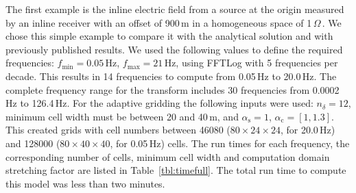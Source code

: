 \documentclass[onecolumn,extra,referee,camera]{gji}
\newcommand{\mr}[1]{\mathrm{#1}}
\newcommand{\ohmm}{\ensuremath{\Omega\,}\text{m}\xspace}
\begin{document}
The first example is the inline electric field from a source at the origin
measured by an inline receiver with an offset of 900\,m in a homogeneous space
of 1\,\ohmm. We chose this simple example to compare it with the analytical
solution and with previously published results. We used the following values to
define the required frequencies: $f_\mr{min}=0.05\,$Hz, $f_\mr{max}=21\,$Hz,
using FFTLog with 5 frequencies per decade. This results in 14 frequencies to
compute from 0.05\,Hz to 20.0\,Hz. The complete frequency range for the
transform includes 30 frequencies from 0.0002\,Hz to 126.4\,Hz. For the
adaptive gridding the following inputs were used: $n_\delta=12$, minimum cell
width must be between 20 and 40\,m, and $\alpha_\mr{s}=1$,
$\alpha_\mr{c}=[1,1.3]$. This created grids with cell numbers between
\num{46080} ($80\times24\times24$, for 20.0\,Hz) and \num{128000}
($80\times40\times40$, for 0.05\,Hz) cells. The run times for each frequency,
the corresponding number of cells, minimum cell width and computation domain
stretching factor are listed in Table~\ref{tbl:timefull}. The total run time to
compute this model was less than two minutes.
%
\end{document}
